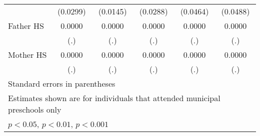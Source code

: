 \begin{table}[htbp]
\begin{tabular}{l*{5}{c}}
            &    (0.0299)         &    (0.0145)         &    (0.0288)         &    (0.0464)         &    (0.0488)         \\
\addlinespace
Father HS   &      0.0000         &      0.0000         &      0.0000         &      0.0000         &      0.0000         \\
            &         (.)         &         (.)         &         (.)         &         (.)         &         (.)         \\
\addlinespace
Mother HS   &      0.0000         &      0.0000         &      0.0000         &      0.0000         &      0.0000         \\
            &         (.)         &         (.)         &         (.)         &         (.)         &         (.)         \\
\bottomrule
\multicolumn{6}{l}{\footnotesize Standard errors in parentheses}\\
\multicolumn{6}{l}{\footnotesize Estimates shown are for individuals that attended municipal preschools only}\\
\multicolumn{6}{l}{\footnotesize \sym{*} \(p<0.05\), \sym{**} \(p<0.01\), \sym{***} \(p<0.001\)}\\
\end{tabular}
\end{table}
